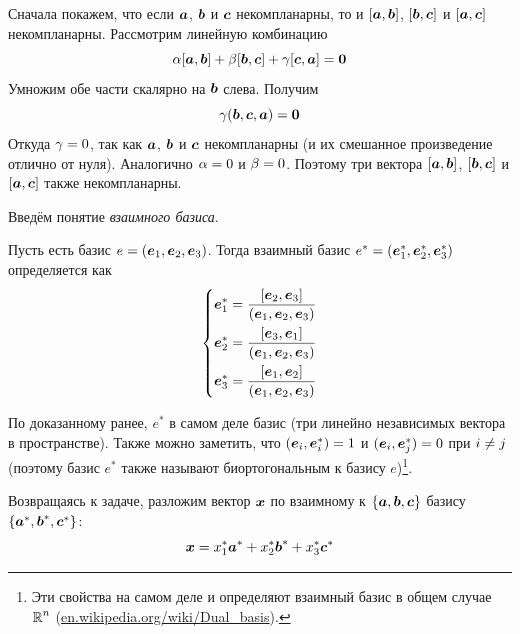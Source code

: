 \documentclass[a4paper,12pt]{article}
\begin{document}
  \begin{solution}
    Сначала покажем, что если $\boldsymbol a$, $\boldsymbol b$ и $\boldsymbol c$ некомпланарны, то и $[\boldsymbol a, \boldsymbol b]$, $[\boldsymbol b, \boldsymbol c]$ и $[\boldsymbol a, \boldsymbol c]$ некомпланарны.
    Рассмотрим линейную комбинацию
    \[
      \alpha [\boldsymbol a, \boldsymbol b] + \beta [\boldsymbol b, \boldsymbol c] + \gamma [\boldsymbol c, \boldsymbol a] = \boldsymbol 0
    \]
    Умножим обе части скалярно на $\boldsymbol b$ слева.
    Получим
    \[
      \gamma (\boldsymbol b, \boldsymbol c, \boldsymbol a) = \boldsymbol 0
    \]
    Откуда $\gamma \hm= 0$, так как $\boldsymbol a$, $\boldsymbol b$ и $\boldsymbol c$ некомпланарны (и их смешанное произведение отлично от нуля).
    Аналогично $\alpha \hm= 0$ и $\beta \hm= 0$.
    Поэтому три вектора $[\boldsymbol a, \boldsymbol b]$, $[\boldsymbol b, \boldsymbol c]$ и $[\boldsymbol a, \boldsymbol c]$ также некомпланарны.
    
    \bigskip
    
    Введём понятие \emph{взаимного базиса}.
    
    \begin{definition}
      Пусть есть базис $e \hm= (\bds e_1, \bds e_2, \bds e_3)$.
      Тогда взаимный базис $e^* \hm= (\bds e_1^*, \bds e_2^*, \bds e_3^*)$ определяется как
      \begin{equation}\label{eq:dual-basis}
        \left\{
          \begin{aligned}
            &\boldsymbol e_1^* = \frac{[\boldsymbol e_2, \boldsymbol e_3]}{(\boldsymbol e_1, \boldsymbol e_2, \boldsymbol e_3)}\\
            &\boldsymbol e_2^* = \frac{[\boldsymbol e_3, \boldsymbol e_1]}{(\boldsymbol e_1, \boldsymbol e_2, \boldsymbol e_3)}\\
            &\boldsymbol e_3^* = \frac{[\boldsymbol e_1, \boldsymbol e_2]}{(\boldsymbol e_1, \boldsymbol e_2, \boldsymbol e_3)}
          \end{aligned}
        \right.
      \end{equation}
    \end{definition}
    
    По доказанному ранее, $e^*$ в самом деле базис (три линейно независимых вектора в пространстве).
    Также можно заметить, что $(\bds e_i, \bds e_i^*) \hm= 1$ и $(\bds e_i, \bds e_j^*) \hm= 0$ при $i \hm{\not=} j$ (поэтому базис $e^*$ также называют биортогональным к базису $e$)\footnote{Эти свойства на самом деле и определяют взаимный базис в общем случае $\operatorname{\mathbb R}^n$ (\href{https://en.wikipedia.org/wiki/Dual\_basis}{en.wikipedia.org/wiki/Dual\_basis}).}.
    
    \bigskip
    
    Возвращаясь к задаче, разложим вектор $\boldsymbol x$ по взаимному к $\{\boldsymbol a, \boldsymbol b, \boldsymbol c\}$ базису $\{\boldsymbol a^*, \boldsymbol b^*, \boldsymbol c^*\}$:
    \[
      \boldsymbol x = x_1^* \boldsymbol a^* + x_2^* \boldsymbol b^* + x_3^* \boldsymbol c^*
    \]
    

\end{solution}
\end{document}
